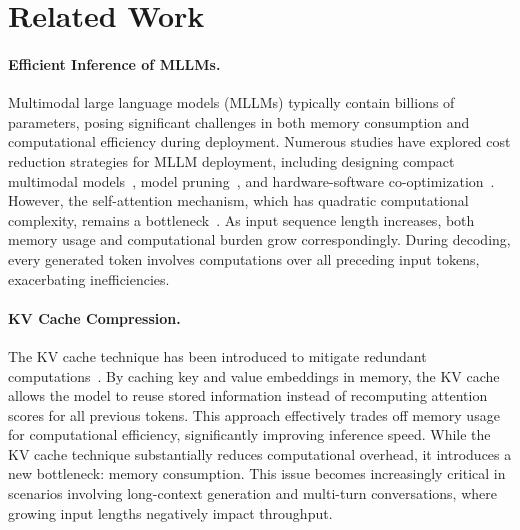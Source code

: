 \section{Related Work}
\paragraph{Efficient Inference of MLLMs.}
Multimodal large language models (MLLMs) typically contain billions of parameters, posing significant challenges in both memory consumption and computational efficiency during deployment. Numerous studies have explored cost reduction strategies for MLLM deployment, including designing compact multimodal models~\citep{lin2024moe,abdin2024phi,chu2023mobilevlm,chu2024mobilevlm,li2024mini, yao2024minicpm}, model pruning~\citep{zhang2024treat,shang2024llava-prumerge,xing2024pyramiddrop,chen2024fastv}, and hardware-software co-optimization~\citep{kwon2023efficient}. However, the self-attention mechanism, which has quadratic computational complexity, remains a bottleneck~\citep{vaswani2017attention}. As input sequence length increases, both memory usage and computational burden grow correspondingly. During decoding, every generated token involves computations over all preceding input tokens, exacerbating inefficiencies.

\paragraph{KV Cache Compression.}
The KV cache technique has been introduced to mitigate redundant computations~\citep{zhang2023h2o}. By caching key and value embeddings in memory, the KV cache allows the model to reuse stored information instead of recomputing attention scores for all previous tokens. This approach effectively trades off memory usage for computational efficiency, significantly improving inference speed. 
While the KV cache technique substantially reduces computational overhead, it introduces a new bottleneck: memory consumption. This issue becomes increasingly critical in scenarios involving long-context generation and multi-turn conversations, where growing input lengths negatively impact throughput.

